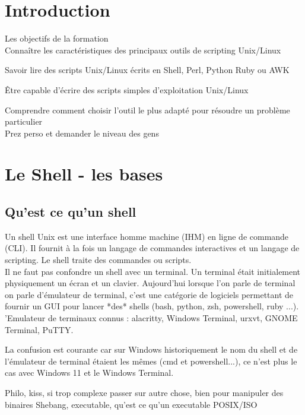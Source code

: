 \documentclass[11pt,a4paper]{article}
\begin{document}

\section{Introduction}

Les objectifs de la formation\\ 

Connaître les caractéristiques des principaux outils de scripting Unix/Linux

Savoir lire des scripts Unix/Linux écrits en Shell, Perl, Python Ruby ou AWK

Être capable d'écrire des scripts simples d'exploitation Unix/Linux

Comprendre comment choisir l'outil le plus adapté pour résoudre un problème particulier
\\

Prez perso et demander le niveau des gens

\section{Le Shell - les bases}

\subsection{Qu'est ce qu'un shell}

Un shell Unix est une interface homme machine (IHM) en ligne de commande (CLI). Il fournit à la fois un langage de commandes interactives et un langage de scripting. Le shell traite des commandes ou scripts.\\ 
Il ne faut pas confondre un shell avec un terminal. Un terminal était initialement physiquement un écran et un clavier. Aujourd'hui lorsque l'on parle de terminal on parle d'émulateur de terminal, c'est une catégorie de logiciels permettant de fournir un GUI pour lancer *des* shells (bash, python, zsh, powershell, ruby ...). 
'Emulateur de terminaux connus : alacritty, Windows Terminal, urxvt, GNOME Terminal, PuTTY.

La confusion est courante car sur Windows historiquement le nom du shell et de l'émulateur de terminal étaient les mêmes (cmd et powershell...), ce n'est plus le cas avec Windows 11 et le Windows Terminal.



Philo, kiss, si trop complexe passer sur autre chose, bien pour manipuler des binaires
Shebang, executable, qu'est ce qu'un executable
POSIX/ISO
\end{document}
